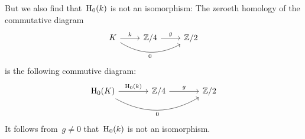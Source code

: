 But we also find that~$\operatorname{H}_0(k)$ is not an isomorphism:
The zeroeth homology of the commutative diagram
\[
  \begin{tikzcd}
      K
      \arrow{r}[above]{k}
      \arrow[bend right]{rr}[below]{0}
    & \Integer/4
      \arrow{r}[above]{g}
    & \Integer/2
  \end{tikzcd}
\]
is the following commutive diagram:
\[
  \begin{tikzcd}[column sep = large]
      \Hl_0(K)
      \arrow{r}[above]{\Hl_0(k)}
      \arrow[bend right]{rr}[below]{0}
    & \Integer/4
      \arrow{r}[above]{g}
    & \Integer/2
  \end{tikzcd}
\]
It follows from~$g \neq 0$ that~$\operatorname{H}_0(k)$ is not an isomorphism.










